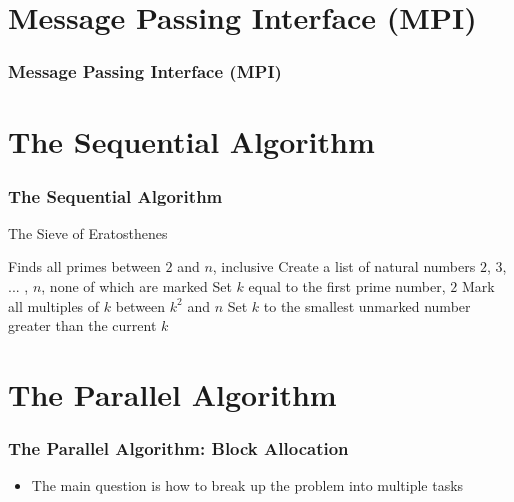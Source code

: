 \documentclass[13pt]{beamer}
\begin{document}
\section{Message Passing Interface (MPI)} %
\begin{frame}
\frametitle{Message Passing Interface (MPI)}

\end{frame}

\begin{frame}

\end{frame}

\section{The Sequential Algorithm} %
\begin{frame}
\frametitle{The Sequential Algorithm}
  \begin{algorithm}[H]
        \caption{The Sieve of Eratosthenes}
        \begin{algorithmic}
          \REQUIRE Finds all primes between $2$ and $n$, inclusive
          \STATE Create a list of natural numbers $2$, $3$, ... , $n$, none of which are marked
          \STATE Set $k$ equal to the first prime number, $2$
            \STATE Mark all multiples of $k$ between $k^2$ and $n$
            \STATE Set $k$ to the smallest unmarked number greater than the current $k$
          \ENDWHILE
        \end{algorithmic}
        \end{algorithm}
\end{frame}

\section{The Parallel Algorithm} %
\begin{frame}
\frametitle{The Parallel Algorithm: Block Allocation}
  \begin{itemize}
    \item The main question is how to break up the problem into multiple tasks
  \end{itemize}
\end{frame}
\end{document}
